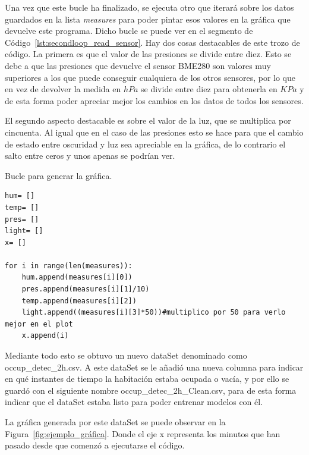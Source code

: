 \documentclass[a4paper, 12pt]{book}
\begin{document}
Una vez que este bucle ha finalizado, se ejecuta otro que iterará sobre los datos guardados en la lista \textit{measures} para poder pintar esos valores en la gráfica que devuelve este programa. Dicho bucle se puede ver en el segmento de Código~\ref{lst:secondloop_read_sensor}. Hay dos cosas destacables de este trozo de código. La primera es que el valor de las presiones se divide entre diez. Esto se debe a que las presiones que devuelve el sensor BME280 son valores muy superiores a los que puede conseguir cualquiera de los otros sensores, por lo que en vez de devolver la medida en $hPa$ se divide entre diez para obtenerla en $KPa$ y de esta forma poder apreciar mejor los cambios en los datos de todos los sensores.


El segundo aspecto destacable es sobre el valor de la luz, que se multiplica por cincuenta. Al igual que en el caso de las presiones esto se hace para que el cambio de estado entre oscuridad y luz sea apreciable en la gráfica, de lo contrario el salto entre ceros y unos apenas se podrían ver.

\begin{listing}[]
    \caption{Bucle para generar la gráfica.}{}
    \label{lst:secondloop_read_sensor}
    \begin{verbatim}
hum= []
temp= []
pres= []
light= []
x= []

for i in range(len(measures)):
    hum.append(measures[i][0])
    pres.append(measures[i][1]/10)
    temp.append(measures[i][2])
    light.append((measures[i][3]*50))#multiplico por 50 para verlo mejor en el plot
    x.append(i)
    \end{verbatim}
\end{listing}

Mediante todo esto se obtuvo un nuevo dataSet denominado como occup\_detec\_2h.csv. A este dataSet se le añadió una nueva columna para indicar en qué instantes de tiempo la habitación estaba ocupada o vacía, y por ello se guardó con el siguiente nombre occup\_detec\_2h\_Clean.csv, para de esta forma indicar que el dataSet estaba listo para poder entrenar modelos con él.

La gráfica generada por este dataSet se puede observar en la Figura~\ref{fig:ejemplo_gráfica}. Donde el eje x representa los minutos que han pasado desde que comenzó a ejecutarse el código.
\end{document}
